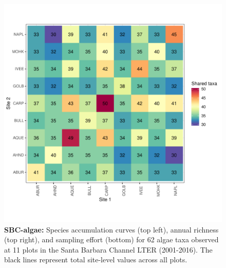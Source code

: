 \documentclass[11pt, oneside]{article}
\begin{document}
\begin{figure}[h!]
\includegraphics[scale = 0.4]{sbc-algae-castorani_spp_shared.pdf}
\caption{{\bf SBC-algae:} Species accumulation curves (top left),  annual richness (top right), and sampling effort (bottom)  for 62 algae taxa observed at 11 plots in the Santa Barbara Channel LTER (2001-2016). The black lines represent total site-level values across all plots.}
\label{sbc-algae}
\end{figure}
\end{document}

